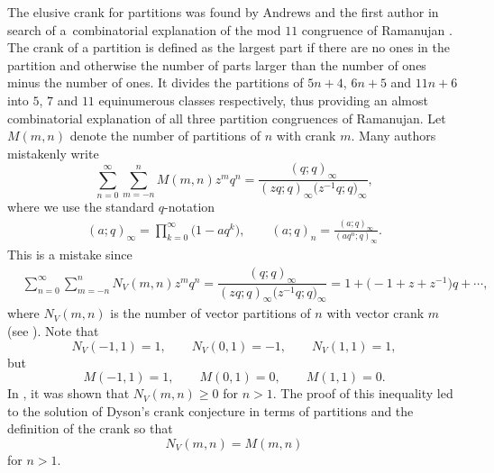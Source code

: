 \documentclass[10pt,a4paper]{amsart}
\numberwithin{equation}{section}
\newcommand\mylabel[1]{\label{#1}}
\begin{document}
The elusive crank for partitions was found by Andrews and the first author in search of a~combinatorial explanation of the mod $11$ congruence of Ramanujan \cite{An-Ga88}. The crank of a partition is defined as the largest part if there are no ones in the partition and otherwise the number of parts larger than the number of ones minus the number of ones. It divides the partitions of $5n+4$, $6n+5$ and $11n+6$ into $5$, $7$ and $11$ equinumerous classes respectively, thus providing an almost combinatorial explanation of all three partition congruences of Ramanujan. Let $M(m,n)$ denote the number of partitions of $n$ with crank $m$. Many authors mistakenly write
\begin{equation*}%
\sum_{n=0}^\infty \sum_{m=-n}^n
M(m,n) z^m q^n =
\dfrac{(q;q)_{\infty}}{(zq;q)_{\infty}\bigl(z^{-1}q;q\bigr)_{\infty}},
\end{equation*}%
where we use the standard $q$-notation
\begin{align*}
(a;q)_{\infty}= \prod_{k=0}^\infty \bigl(1-aq^k\bigr),
\qquad
(a;q)_{n}= \frac{(a;q)_{\infty}}{(aq^n;q)_{\infty}}.
\end{align*}
This is a mistake since
\begin{align*}
&{}\sum_{n=0}^\infty
\sum_{m=-n}^n N_V(m,n)z^mq^n=
\dfrac{(q;q)_{\infty}}{(zq;q)_{\infty}\bigl(z^{-1}q;q\bigr)_{\infty}}
=1+\bigl(-1+z+z^{-1}\bigr)q+\cdots,
\end{align*}
where $N_V(m, n)$ is the number of vector partitions of $n$ with vector
crank $m$ (see \cite{An-Ga88,Ga86,Ga88}).
Note that
\begin{equation*}%
N_V(-1,1)=1,\qquad N_V(0,1)=-1,\qquad N_V(1,1)=1,
\end{equation*}%
but
\begin{equation*}%
M(-1,1)=1,\qquad M(0,1)=0,\qquad M(1,1)=0.
\end{equation*}%
In \cite{Ga88b}, it was shown that $N_V(m,n)\geq 0$ for $n>1$. The proof of this inequality led to the solution of Dyson's crank conjecture in terms of partitions and the definition of the crank \cite{An-Ga88} so that
\begin{equation*}%
N_V(m,n)=M(m,n)
\end{equation*}%
for $n>1$.
\end{document}
